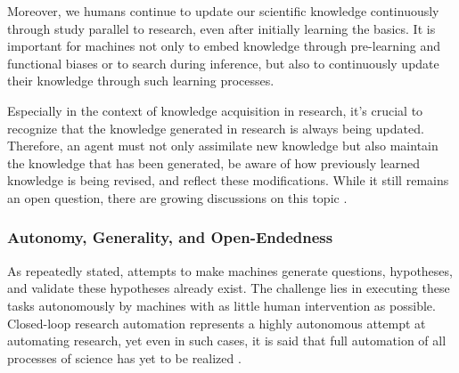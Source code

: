Moreover, we humans continue to update our scientific knowledge continuously through study parallel to research, even after initially learning the basics. It is important for machines not only to embed knowledge through pre-learning and functional biases or to search during inference, but also to continuously update their knowledge through such learning processes.

Especially in the context of knowledge acquisition in research, it's crucial to recognize that the knowledge generated in research is always being updated. Therefore, an agent must not only assimilate new knowledge but also maintain the knowledge that has been generated, be aware of how previously learned knowledge is being revised, and reflect these modifications. While it still remains an open question, there are growing discussions on this topic \cite{kitano2021nobel,zenil2023future}.





\subsubsection{Autonomy, Generality, and Open-Endedness}
As repeatedly stated, attempts to make machines generate questions, hypotheses, and validate these hypotheses already exist. The challenge lies in executing these tasks autonomously by machines with as little human intervention as possible. Closed-loop research automation represents a highly autonomous attempt at automating research, yet even in such cases, it is said that full automation of all processes of science has yet to be realized \cite{zenil2023,coley2020autonomous,coley2020autonomousII}. 

